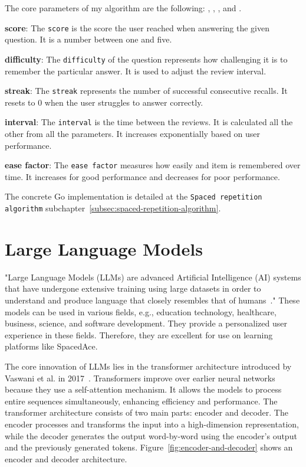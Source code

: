 The core parameters of my algorithm are the following: , , ,  and .

\textbf{score}: The \texttt{score} is the score the user reached when answering the given question. It is a number between one and five.

\textbf{difficulty}: The \texttt{difficulty} of the question represents how challenging it is to remember the particular answer. It is used to adjust the review interval.

\textbf{streak}: The \texttt{streak} represents the number of successful consecutive recalls. It resets to 0 when the user struggles to answer correctly.

\textbf{interval}: The \texttt{interval} is the time between the reviews. It is calculated all the other from all the parameters. It increases exponentially based on user performance.

\textbf{ease factor}: The \texttt{ease factor} measures how easily and item is remembered over time. It increases for good performance and decreases for poor performance.

The concrete Go implementation is detailed at the \texttt{Spaced repetition algorithm} subchapter~\ref{subsec:spaced-repetition-algorithm}.

\section{Large Language Models}

"Large Language Models (LLMs) are advanced Artificial Intelligence (AI) systems that have undergone extensive training using large datasets in order to understand and produce language that closely resembles that of humans~\cite{buscemi2023comparative}."  These models can be used in various fields, e.g., education technology, healthcare, business, science, and software development. They provide a personalized user experience in these fields. Therefore, they are excellent for use on learning platforms like SpacedAce.

The core innovation of LLMs lies in the transformer architecture introduced by Vaswani et al. in 2017~\cite{vaswani2017attention}. Transformers improve over earlier neural networks because they use a self-attention mechanism. It allows the models to process entire sequences simultaneously, enhancing efficiency and performance. The transformer architecture consists of two main parts: encoder and decoder. The encoder processes and transforms the input into a high-dimension representation, while the decoder generates the output word-by-word using the encoder's output and the previously generated tokens. Figure~\ref{fig:encoder-and-decoder} shows an encoder and decoder architecture.

